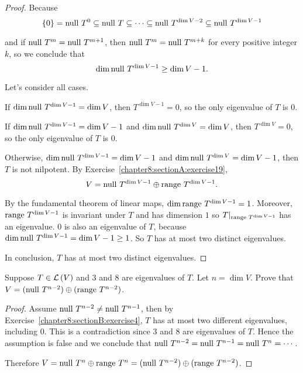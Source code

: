 \begin{proof}
    Because
    \[
        \{0\} = \operatorname{null}\,{T^{0}}\subseteq \operatorname{null}\,{T}\subseteq \cdots \subseteq \operatorname{null}\,{T^{\dim V - 2}} \subseteq \operatorname{null}\,{T^{\dim V - 1}}
    \]

    and if $\operatorname{null}\,{T^{m}} = \operatorname{null}\,{T^{m+1}}$, then $\operatorname{null}\,{T^{m}} = \operatorname{null}\,{T^{m+k}}$ for every positive integer $k$, so we conclude that
    \[
        \dim\operatorname{null}\,{T^{\dim V - 1}}\geq \dim V - 1.
    \]

    Let's consider all cases.

    If $\dim\operatorname{null}\,{T^{\dim V - 1}} = \dim V$, then $T^{\dim V - 1} = 0$, so the only eigenvalue of $T$ is $0$.

    If $\dim\operatorname{null}\,{T^{\dim V - 1}} = \dim V - 1$ and $\dim\operatorname{null}\,{T^{\dim V}} = \dim V$, then $T^{\dim V} = 0$, so the only eigenvalue of $T$ is $0$.

    Otherwise, $\dim\operatorname{null}\,{T^{\dim V - 1}} = \dim V - 1$ and $\dim\operatorname{null}\,{T^{\dim V}} = \dim V - 1$, then $T$ is not nilpotent. By Exercise~\ref{chapter8:sectionA:exercise19},
    \[
        V = \operatorname{null}\,{T^{\dim V -  1}}\oplus\operatorname{range}\,{T^{\dim V - 1}}.
    \]

    By the fundamental theorem of linear maps, $\dim\operatorname{range}\,{T^{\dim V - 1}} = 1$. Moreover, $\operatorname{range}\,{T^{\dim V - 1}}$ is invariant under $T$ and has dimension $1$ so $T\vert_{\operatorname{range}\,{T^{\dim V - 1}}}$ has an eigenvalue. $0$ is also an eigenvalue of $T$, because $\dim\operatorname{null}\,{T^{\dim V - 1}} = \dim V - 1 \geq 1$. So $T$ has at most two distinct eigenvalues.

    In conclusion, $T$ has at most two distinct eigenvalues.
\end{proof}
\newpage

\begin{exercise}\label{chapter8:sectionB:exercise5}
    Suppose $T\in\mathcal{L}\left({V}\right)$ and $3$ and $8$ are eigenvalues of $T$. Let $n = \dim V$. Prove that $V = {(\operatorname{null}\,{T^{n-2}})}\oplus {(\operatorname{range}\,{T^{n-2}})}$.
\end{exercise}

\begin{proof}
    Assume $\operatorname{null}\,{T^{n-2}}\ne \operatorname{null}\,{T^{n-1}}$, then by Exercise~\ref{chapter8:sectionB:exercise4}, $T$ has at most two different eigenvalues, including $0$. This is a contradiction since $3$ and $8$ are eigenvalues of $T$. Hence the assumption is false and we conclude that $\operatorname{null}\,{T^{n-2}} = \operatorname{null}\,{T^{n-1}} = \operatorname{null}\,{T^{n}} = \cdots$.

    Therefore $V = \operatorname{null}\,{T^{n}}\oplus\operatorname{range}\,{T^{n}} = (\operatorname{null}\,{T^{n-2}})\oplus(\operatorname{range}\,{T^{n-2}})$.
\end{proof}
\newpage

